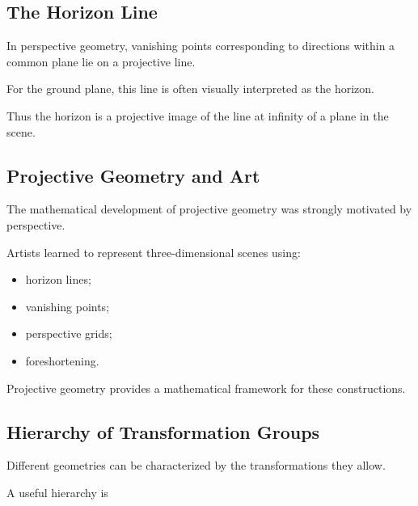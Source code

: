 \subsection{The Horizon Line}
\label{subsec:projective-horizon-line}

In perspective geometry, vanishing points corresponding to directions within
a common plane lie on a projective line.

For the ground plane, this line is often visually interpreted as the horizon.

Thus the horizon is a projective image of the line at infinity of a plane in
the scene.

\subsection{Projective Geometry and Art}
\label{subsec:projective-art}

The mathematical development of projective geometry was strongly motivated
by perspective.

Artists learned to represent three-dimensional scenes using:

\begin{itemize}
    \item horizon lines;
    \item vanishing points;
    \item perspective grids;
    \item foreshortening.
\end{itemize}

Projective geometry provides a mathematical framework for these constructions.

\subsection{Hierarchy of Transformation Groups}
\label{subsec:projective-transformation-hierarchy}

Different geometries can be characterized by the transformations they allow.

A useful hierarchy is

\begin{centereddiagram}
\end{centereddiagram}

